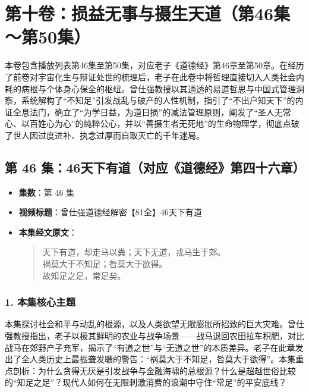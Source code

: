 \section*{第十卷：损益无事与摄生天道（第46集～第50集）}

本卷包含播放列表第46集至第50集，对应老子《道德经》第46章至第50章。在经历了前卷对宇宙化生与辩证处世的梳理后，老子在此卷中将哲理直接切入人类社会内耗的病根与个体身心保全的枢纽。曾仕强教授以其通透的易道哲思与中国式管理洞察，系统解构了“不知足”引发战乱与破产的人性机制，指引了“不出户知天下”的内证全息法门，确立了“为学日益，为道日损”的减法管理原则，阐发了“圣人无常心、以百姓心为心”的纯粹公心，并以“善摄生者无死地”的生命物理学，彻底点破了世人因过度进补、执念过厚而自取灭亡的千年迷局。

\clearpage

\subsection{第 46 集：46天下有道（对应《道德经》第四十六章）}
\label{sec:ep46}

\begin{itemize}
    \item \textbf{集数}：第 46 集
    \item \textbf{视频标题}：曾仕强道德经解密【81全】46天下有道
    
    \item \textbf{本集经文原文}：
    \begin{quote}\kaishu
    天下有道，却走马以粪；天下无道，戎马生于郊。\\
    祸莫大于不知足；咎莫大于欲得。\\
    故知足之足，常足矣。
    \end{quote}
\end{itemize}

\subsubsection{1. 本集核心主题}
本集探讨社会和平与动乱的根源，以及人类欲望无限膨胀所招致的巨大灾难。曾仕强教授指出，老子以极其鲜明的农业与战争场景——战马退回农田拉车积肥，对比战马在郊野产子充军，揭示了“有道之世”与“无道之世”的本质差异。老子在此章发出了全人类历史上最振聋发聩的警告：“祸莫大于不知足，咎莫大于欲得”。本集重点剖析：为什么贪得无厌是引发战争与金融海啸的总根源？什么是超越世俗比较的“知足之足”？现代人如何在无限刺激消费的浪潮中守住“常足”的平安底线？

